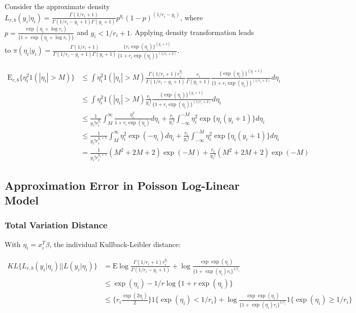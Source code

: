 \documentclass[10pt]{article}
\newcommand{\xbeta}{ x_i^T \beta}
\begin{document}
Consider the approximate density $L_{r,b} (y_i| \eta_i) =\frac{\Gamma(1/r_i+1)}{\Gamma(1/r_i-y_i+1)\Gamma(y_i+1)} p^{y_i} (1-p)^{(1/r_i-y_i)}$, where $p=\frac{\exp ( \eta_i+\log r_i)}{\{1+ \exp ( \eta_i +\log r_i)\}}$ and $y_i< 1/r_i+1$.  Applying density transformation leads to $\pi(\eta_{i}|y_i) = \frac{\Gamma(1/r_i+1)}{\Gamma(1/r_i-y_i+1)\Gamma(y_i+1)}\frac{\{r_i\exp(\eta_{i})\}^{(y_i+1)}}{\{1+r_i\exp(\eta_{i})\}^{(1/r_i+2)}}$.

\begin{equation}
	\begin{aligned}
			\mbox{E}_{r,b}\{ \eta_{i}^2 1(|\eta_{i}|>M) \}  %
	&	 \le      \int      \eta_i^2  1(|\eta_{i}|>M)  \frac{\Gamma(1/r_i+1)r_i^{y_i}}{\Gamma(1/r_i-y_i+1)}\frac{r_i}{\Gamma(y_i+1)}\frac{\{\exp(\eta_{i})\}^{(y_i+1)}}{\{1+r_i\exp(\eta_{i})\}^{(1/r_i+2)}} d\eta_i  \\
	&  \le \int \eta_i^2  1(|\eta_{i}|>M) \frac{r_i}{y_i!}\frac{\{\exp(\eta_{i})\}^{(y_i+1)}}{\{1+r_i\exp(\eta_{i})\}^{(1/r_i+2)}} d\eta_i  \\	
		& \le \frac{1}{y_i! r_i^{y_i}} \int_M^{\infty} \frac{\eta_{i}^2}{1+r_i\exp(\eta_{i})} d\eta_{i} +  \frac{r_i}{y_i!} \int_{-\infty}^{-M}{\eta_{i}^2}{\exp\{\eta_{i} (y_i+1) \}}d\eta_{i} \\
		& \le \frac{1}{y_i! r_i^{y_i+1}} \int_M^{\infty} {\eta_{i}^2}{\exp(-\eta_{i})} d\eta_{i} +  \frac{r_i}{y_i!} \int_{-\infty}^{-M}{\eta_{i}^2}{\exp\{\eta_{i} (y_i+1) \}}d\eta_{i} \\
	& = \frac{1}{y_i! r_i^{y_i+1}} (M^2+2M+2)\exp(-M) + \frac{r_i}{y_i!}   (M^2+2M+2)\exp(-M) 
	\end{aligned}
\end{equation}

\subsection{Approximation Error in Poisson Log-Linear Model}

\subsubsection{Total Variation Distance}

With $\eta_i=\xbeta$, the individual Kullback-Leibler distance:

\begin{equation}
\begin{aligned}
KL\{ { L_{r,b}(y_i|\eta_{i}) } || {L(y_i|\eta_{i})} \}& =\mbox{E}\log \frac{\Gamma(1/r_i+1) r_i^{y_i}  }{\Gamma(1/r_i -y_i+1)   } + \log \frac{ \exp\exp(\eta_{i})}{ \{1+\exp(\eta_{i})r_i\}^{1/r_i}}\\
& \le \exp ( \eta_{i})   - 1/r \log\{1+ r\exp ( \eta_{i})\}\\
& \le   \{   r_i \frac{ \exp(2\eta_{i})}{2} \}  1\{\exp(\eta_{i})< 1/r_i\} + \log \frac{ \exp\exp(\eta_{i})}{ \{1+\exp(\eta_{i})r_i\}^{1/r_i}} 1\{\exp(\eta_{i})\ge 1/r_i\} \\
\label{KL_poisson}
\end{aligned}
\end{equation}
\end{document}
